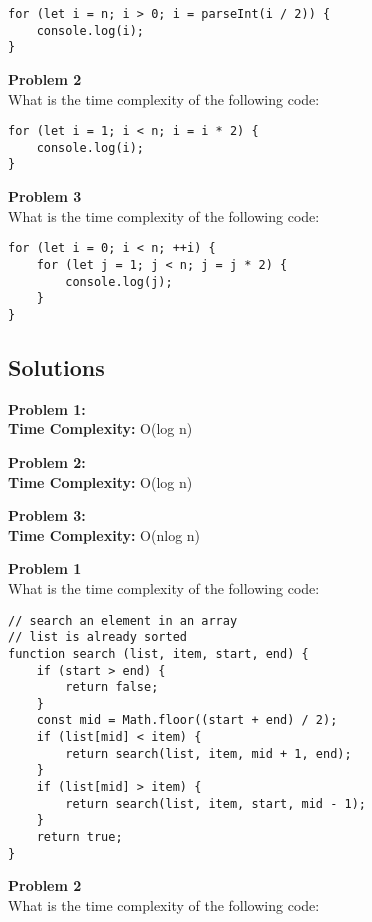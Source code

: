 \begin{verbatim}
for (let i = n; i > 0; i = parseInt(i / 2)) {
    console.log(i);
}
\end{verbatim}

\textbf{Problem 2}\\
What is the time complexity of the following code:

\begin{verbatim}
for (let i = 1; i < n; i = i * 2) {
    console.log(i);
}
\end{verbatim}

\textbf{Problem 3}\\
What is the time complexity of the following code:

\begin{verbatim}
for (let i = 0; i < n; ++i) {
    for (let j = 1; j < n; j = j * 2) {
        console.log(j);
    }
}
\end{verbatim}

\hypertarget{a637}{\subsection{Solutions}\label{a637}}

\textbf{Problem 1:}\\
\textbf{Time Complexity:} O(log n)

\textbf{Problem 2:}\\
\textbf{Time Complexity:} O(log n)

\textbf{Problem 3:}\\
\textbf{Time Complexity:} O(nlog n)

{}{}{}

\hypertarget{5633}{\label{5633}}

\textbf{Problem 1}\\
What is the time complexity of the following code:

\begin{verbatim}
// search an element in an array
// list is already sorted
function search (list, item, start, end) {
    if (start > end) {
        return false;
    }
    const mid = Math.floor((start + end) / 2);
    if (list[mid] < item) {
        return search(list, item, mid + 1, end);
    }
    if (list[mid] > item) {
        return search(list, item, start, mid - 1);
    }
    return true;
}
\end{verbatim}

\textbf{Problem 2}\\
What is the time complexity of the following code:

